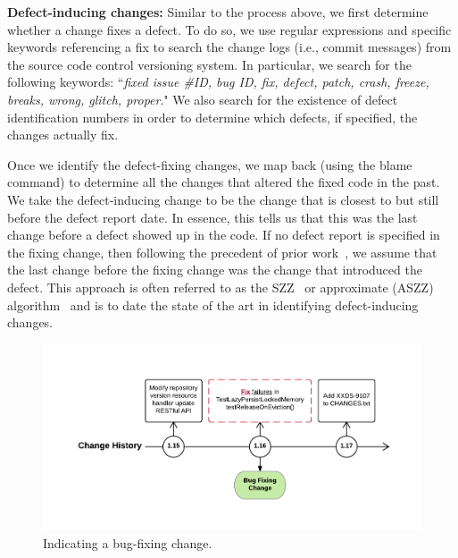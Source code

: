 \noindent\textbf{Defect-inducing changes:} Similar to the process above, we first determine whether a change fixes a defect. To do so, we use regular expressions and specific keywords referencing a fix to search the change logs (i.e., commit messages) from the source code control versioning system. In particular, we search for the following keywords: ``\textit{fixed issue \#ID, bug ID, fix, defect,  patch, crash, freeze, breaks, wrong, glitch, proper}." We also search for the existence of defect identification numbers in order to determine which defects, if specified, the changes actually fix.

Once we identify the defect-fixing changes, we map back (using the blame~ command) to determine all the changes that altered the fixed code in the past. We take the defect-inducing change to be the change that is closest to but still before the defect report date. In essence, this tells us that this was the last change before a defect showed up in the code. If no defect report is specified in the fixing change, then following the precedent of prior work~\cite{Kamei-tse-2013}, we assume that the last change before the fixing change was the change that introduced the defect. This approach is often referred to as the SZZ~\cite{sliwerski-msr-2005} or approximate (ASZZ) algorithm~\cite{Kamei-tse-2013} and is to date the state of the art in identifying defect-inducing changes.


\begin{figure}[h]
	\centering
	\includegraphics[width=150mm]{figures/chapter3/bug-fixing-change}
	\caption{Indicating a bug-fixing change.}
	\label{fig:indicating-a-bug-fixing-change}
\end{figure}



